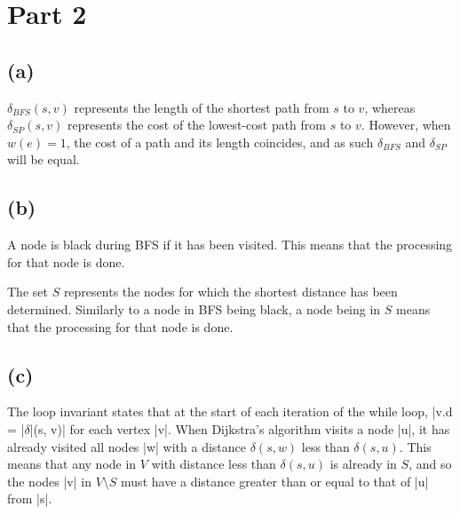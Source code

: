 \documentclass[a4paper]{article}
\begin{document}

\section*{Part 2}

\subsection*{(a)}

\(\delta_{BFS}(s, v)\) represents the length of the shortest path from \(s\) to \(v\), whereas \(\delta_{SP}(s, v)\) represents the cost of the lowest-cost path from \(s\) to \(v\). However, when \(w(e) = 1\), the cost of a path and its length coincides, and as such \(\delta_{BFS}\) and \(\delta_{SP}\) will be equal.

\subsection*{(b)}

A node is black during BFS if it has been visited. This means that the processing for that node is done.

The set \(S\) represents the nodes for which the shortest distance has been determined. Similarly to a node in BFS being black, a node being in \(S\) means that the processing for that node is done.

\subsection*{(c)}

The loop invariant states that at the start of each iteration of the while loop, \code|v.d = |\(\delta\)\code|(s, v)| for each vertex \code|v|. When Dijkstra's algorithm visits a node \code|u|, it has already visited all nodes \code|w| with a distance \(\delta(s, w)\) less than \(\delta(s, u)\). This means that any node in \(V\) with distance less than \(\delta(s, u)\) is already in \(S\), and so the nodes \code|v| in \(V \setminus S\) must have a distance greater than or equal to that of \code|u| from \code|s|.
\end{document}
